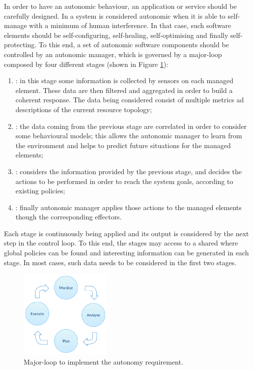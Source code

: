 In order to have an autonomic behaviour, an application or service should be carefully designed. In 
\cite{ibm2005architectural} a system is considered autonomic when it is able to self-manage with a
minimum of human interference. In that case, such software elements should be self-configuring,
self-healing, self-optimising and finally self-protecting. To this end, a set of autonomic software
components should be controlled by an autonomic manager, which is governed by a major-loop
composed by four different stages (shown in Figure \ref{img:elasticity-requirements-autonomy}):

\begin{enumerate}
	\item{: in this stage some information is collected by sensors on each managed
		element. These data are then filtered and aggregated in order to build a coherent response. The
		data being considered consist of multiple metrics ad descriptions of the current resource
		topology;}
	\item{: the data coming from the previous stage are correlated in order to consider
		some behavioural models; this allows the autonomic manager to learn from the environment and helps
		to predict future situations for the managed elements;}
	\item{: considers the information provided by the previous stage, and decides the
		actions to be performed in order to reach the system goals, according to existing policies;}
	\item{: finally autonomic manager applies those actions to the managed elements
		though the corresponding effectors.}
\end{enumerate}

Each stage is continuously being applied and its output is considered by the next step in the control
loop. To this end, the stages may access to a shared  where global policies
can be found and interesting information can be generated in each stage. In most cases, such data
needs to be considered in the first two stages.

\begin{figure}
	\centering{}
	\includegraphics[width=0.4\textwidth]{chapters/elasticity/images/autonomy.png}
	\caption[Major-loop for autonomy]{Major-loop to implement the autonomy requirement.}
	\label{img:elasticity-requirements-autonomy}
\end{figure}

